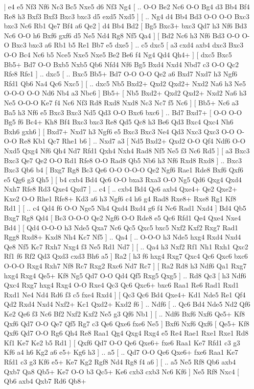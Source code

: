 \makegametitle 
|   e4   e5    Nf3   Nf6    Nc3   Bc5    Nxe5   d6    Nf3   Ng4 [ .. O-O  Be2 Nc6  O-O Bg4  d3 Bb4  Bf4 Re8  h3 Bxf3  Bxf3 Bxc3  bxc3 d5  exd5 Nxd5   ]  [ .. Ng4  d4 Bb4  Bd3 O-O  O-O Bxc3  bxc3 Nc6  Rb1 Qe7  Bf4 a6  Qe2   ]  d4   Bb4    Bd2 [  Bg5 Bxc3+  bxc3 Qd7  h3 Nf6  Bd3 Nc6  O-O h6  Bxf6 gxf6  d5 Ne5  Nd4 Rg8  Nf5 Qa4   ]  [  Bd2 Nc6  h3 Nf6  Bd3 O-O  O-O Bxc3  bxc3 a6  Rb1 b5  Re1 Bb7  e5 dxe5   ] .. c5    dxc5 [  a3 cxd4  axb4 dxc3  Bxc3 O-O  Bc4 Nc6  b5 Nce5  Nxe5 Nxe5  Be2 Be6  f4 Ng4  Qd4 Qh4+   ]  [  dxc5 Bxc5  Bb5+ Bd7  O-O Bxb5  Nxb5 Qb6  Nfd4 Nf6  Bg5 Bxd4  Nxd4 Nbd7  c3 O-O  Qc2 Rfe8  Rfe1   ] .. dxc5 [ .. Bxc5  Bb5+ Bd7  O-O O-O  Qe2 a6  Bxd7 Nxd7  h3 Ngf6  Rfd1 Qb6  Na4 Qc6  Nxc5   ]  [ .. dxc5  Nb5 Bxd2+  Qxd2 Qxd2+  Nxd2 Na6  h3 Ne5  O-O-O O-O  Nd6 Nb4  a3 Nbc6   ]  Bb5+ [  Nb5 Bxd2+  Qxd2 Qxd2+  Nxd2 Na6  h3 Ne5  O-O-O Ke7  f4 Nc6  Nf3 Rd8  Rxd8 Nxd8  Nc3 Nc7  f5 Nc6   ]  [  Bb5+ Nc6  a3 Ba5  h3 Nf6  e5 Bxc3  Bxc3 Nd5  Qd3 O-O  Bxc6 bxc6   ] .. Bd7    Bxd7+ [  O-O O-O  Bg5 f6  Bc4+ Kh8  Bf4 Bxc3  bxc3 Re8  Qd5 Qc8  h3 Be6  Qd3 Bxc4  Qxc4 Nh6  Bxh6 gxh6   ]  [  Bxd7+ Nxd7  h3 Ngf6  e5 Bxc3  Bxc3 Ne4  Qd3 Nxc3  Qxc3 O-O  O-O-O Re8  Kb1 Qc7  Rhe1 b6   ] .. Nxd7    a3 [  Nd5 Bxd2+  Qxd2 O-O  Qf4 Ndf6  O-O Nxd5  Qxg4 Nf6  Qh4 Nd7  Rfd1 Qxh4  Nxh4 Rad8  Nf5 Ne5  f3 Nc6  Rd5   ]  [  a3 Bxc3  Bxc3 Qe7  Qe2 O-O  Rd1 Rfe8  O-O Rad8  Qb5 Nb6  h3 Nf6  Rxd8 Rxd8   ] .. Bxc3    Bxc3   Qb6    b4 [  Bxg7 Rg8  Bc3 Qe6  O-O O-O-O  Qe2 Ngf6  Rae1 Rde8  Bxf6 Qxf6  e5 Qg6  g3 Qh5   ]  [  b4 cxb4  Bd4 Qc6  O-O bxa3  Rxa3 O-O  Ng5 Qd6  Qxg4 Qxd4  Nxh7 Rfe8  Rd3 Qxe4  Qxd7   ] .. c4 [ .. cxb4  Bd4 Qc6  axb4 Qxe4+  Qe2 Qxe2+  Kxe2 O-O  Rhe1 Rfe8+  Kd3 a6  h3 Ngf6  c4 h6  g4 Rad8  Rxe8+ Rxe8  Rg1 Kf8  Rd1   ]  [ .. c4  Qd4 f6  O-O Nge5  Nh4 Qxd4  Bxd4 g6  f4 Nc6  Rad1 Nxd4   ]  Bd4   Qb5    Bxg7   Rg8    Qd4 [  Bc3 O-O-O  Qe2 Ngf6  O-O Rde8  e5 Qc6  Rfd1 Qe4  Qxe4 Nxe4  Bd4   ]  [  Qd4 O-O-O  h3 Nde5  Qxa7 Nc6  Qc5 Qxc5  bxc5 Nxf2  Kxf2 Rxg7  Rad1 Rgg8  Rxd8+ Kxd8  Nh4 Kc7  Nf5   ] .. Qa4 [ .. O-O-O  h3 Nde5  hxg4 Rxd4  Nxd4 Qe8  Nf5 Kc7  Rxh7 Nxg4  f3 Ne5  Rd1 Nd7   ]  [ .. Qa4  h3 Nxf2  Rf1 Nh1  Rxh1 Qxc2  Rf1 f6  Rf2 Qd3  Qxd3 cxd3  Bh6 a5   ]  Ra2 [  h3 f6  hxg4 Rxg7  Qxc4 Qc6  Qxc6 bxc6  O-O-O Rxg4  Rxh7 Nf8  Rc7 Rxg2  Rxc6 Nd7  Rc7   ]  [  Ra2 Rd8  h3 Ndf6  Qa1 Rxg7  hxg4 Rxg4  Qe5+ Kf8  Ng5 Qd7  O-O Qd4  Qf5 Rxg5  Qxg5   ] .. Rd8    Qc3 [  h3 Ndf6  Qxc4 Rxg7  hxg4 Rxg4  O-O Rxe4  Qc3 Qc6  Qxc6+ bxc6  Raa1 Re6  Rad1 Rxd1  Rxd1 Ne4  Nd4 Rd6  f3 c5  fxe4 Rxd4   ]  [  Qc3 Qc6  Bd4 Qxe4+  Kd1 Nde5  Re1 Qf4  Qd2 Rxd4  Nxd4 Nxf2+  Kc1 Qxd2+  Kxd2 f6   ] .. Ndf6 [ .. Qc6  Bd4 Nde5  Nd2 Qf6  Ke2 Qe6  f3 Nc6  Bf2 Nxf2  Kxf2 Ne5  g3 Qf6  Nb1   ]  [ .. Ndf6  Bxf6 Nxf6  Qe5+ Kf8  Qxf6 Qd7  O-O Qe7  Qf5 Rg7  c3 Qe6  Qxe6 fxe6  Ne5   ]  Bxf6   Nxf6    Qxf6 [  Qe5+ Kf8  Qxf6 Qd7  O-O Rg6  Qh4 Re8  Raa1 Qg4  Qxg4 Rxg4  e5 Re4  Rae1 Rxe1  Rxe1 Rd8  Kf1 Ke7  Ke2 b5  Rd1   ]  [  Qxf6 Qd7  O-O Qe6  Qxe6+ fxe6  Raa1 Ke7  Rfd1 c3  g3 Kf6  a4 h6  Kg2 a6  e5+ Kg6  h3   ] .. a5 [ .. Qd7  O-O Qe6  Qxe6+ fxe6  Raa1 Ke7  Rfd1 c3  g3 Kf6  e5+ Ke7  Kg2 Rgf8  Nd4 Rg8  f4 a6   ]  [ .. a5  Ne5 Rf8  Qb6 axb4  Qxb7 Qa8  Qb5+ Ke7  O-O b3  Qc5+ Ke6  cxb3 cxb3  Nc6 Kf6   ]  Ne5   Rf8    Nxc4 [  Qb6 axb4  Qxb7 Rd6  Qb8+ 